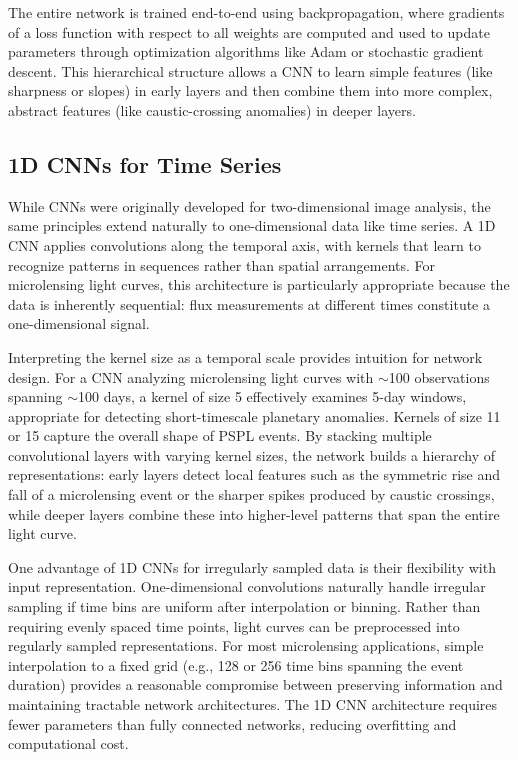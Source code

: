 The entire network is trained end-to-end using backpropagation, where gradients of a loss function with respect to all weights are computed and used to update parameters through optimization algorithms like Adam or stochastic gradient descent. This hierarchical structure allows a CNN to learn simple features (like sharpness or slopes) in early layers and then combine them into more complex, abstract features (like caustic-crossing anomalies) in deeper layers.

\subsection{1D CNNs for Time Series}
\label{sec:cnn_1d}

While CNNs were originally developed for two-dimensional image analysis, the same principles extend naturally to one-dimensional data like time series. A 1D CNN applies convolutions along the temporal axis, with kernels that learn to recognize patterns in sequences rather than spatial arrangements. For microlensing light curves, this architecture is particularly appropriate because the data is inherently sequential: flux measurements at different times constitute a one-dimensional signal.

Interpreting the kernel size as a temporal scale provides intuition for network design. For a CNN analyzing microlensing light curves with $\sim$100 observations spanning $\sim$100 days, a kernel of size 5 effectively examines 5-day windows, appropriate for detecting short-timescale planetary anomalies. Kernels of size 11 or 15 capture the overall shape of PSPL events. By stacking multiple convolutional layers with varying kernel sizes, the network builds a hierarchy of representations: early layers detect local features such as the symmetric rise and fall of a microlensing event or the sharper spikes produced by caustic crossings, while deeper layers combine these into higher-level patterns that span the entire light curve.

One advantage of 1D CNNs for irregularly sampled data is their flexibility with input representation. One-dimensional convolutions naturally handle irregular sampling if time bins are uniform after interpolation or binning. Rather than requiring evenly spaced time points, light curves can be preprocessed into regularly sampled representations. For most microlensing applications, simple interpolation to a fixed grid (e.g., 128 or 256 time bins spanning the event duration) provides a reasonable compromise between preserving information and maintaining tractable network architectures. The 1D CNN architecture requires fewer parameters than fully connected networks, reducing overfitting and computational cost.

